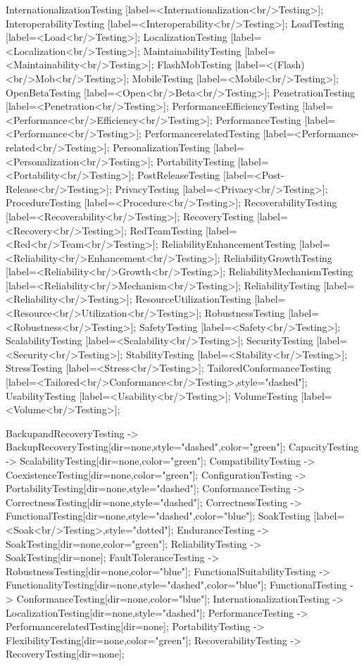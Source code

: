 \documentclass{article}
\begin{document}
{InternationalizationTesting [label=<Internationalization<br/>Testing>];
InteroperabilityTesting [label=<Interoperability<br/>Testing>];
LoadTesting [label=<Load<br/>Testing>];
LocalizationTesting [label=<Localization<br/>Testing>];
MaintainabilityTesting [label=<Maintainability<br/>Testing>];
FlashMobTesting [label=<(Flash)<br/>Mob<br/>Testing>];
MobileTesting [label=<Mobile<br/>Testing>];
OpenBetaTesting [label=<Open<br/>Beta<br/>Testing>];
PenetrationTesting [label=<Penetration<br/>Testing>];
PerformanceEfficiencyTesting [label=<Performance<br/>Efficiency<br/>Testing>];
PerformanceTesting [label=<Performance<br/>Testing>];
PerformancerelatedTesting [label=<Performance-related<br/>Testing>];
PersonalizationTesting [label=<Personalization<br/>Testing>];
PortabilityTesting [label=<Portability<br/>Testing>];
PostReleaseTesting [label=<Post-Release<br/>Testing>];
PrivacyTesting [label=<Privacy<br/>Testing>];
ProcedureTesting [label=<Procedure<br/>Testing>];
RecoverabilityTesting [label=<Recoverability<br/>Testing>];
RecoveryTesting [label=<Recovery<br/>Testing>];
RedTeamTesting [label=<Red<br/>Team<br/>Testing>];
ReliabilityEnhancementTesting [label=<Reliability<br/>Enhancement<br/>Testing>];
ReliabilityGrowthTesting [label=<Reliability<br/>Growth<br/>Testing>];
ReliabilityMechanismTesting [label=<Reliability<br/>Mechanism<br/>Testing>];
ReliabilityTesting [label=<Reliability<br/>Testing>];
ResourceUtilizationTesting [label=<Resource<br/>Utilization<br/>Testing>];
RobustnessTesting [label=<Robustness<br/>Testing>];
SafetyTesting [label=<Safety<br/>Testing>];
ScalabilityTesting [label=<Scalability<br/>Testing>];
SecurityTesting [label=<Security<br/>Testing>];
StabilityTesting [label=<Stability<br/>Testing>];
StressTesting [label=<Stress<br/>Testing>];
TailoredConformanceTesting [label=<Tailored<br/>Conformance<br/>Testing>,style="dashed"];
UsabilityTesting [label=<Usability<br/>Testing>];
VolumeTesting [label=<Volume<br/>Testing>];

BackupandRecoveryTesting -> BackupRecoveryTesting[dir=none,style="dashed",color="green"];
CapacityTesting -> ScalabilityTesting[dir=none,color="green"];
CompatibilityTesting -> CoexistenceTesting[dir=none,color="green"];
ConfigurationTesting -> PortabilityTesting[dir=none,style="dashed"];
ConformanceTesting -> CorrectnessTesting[dir=none,style="dashed"];
CorrectnessTesting -> FunctionalTesting[dir=none,style="dashed",color="blue"];
SoakTesting [label=<Soak<br/>Testing>,style="dotted"];
EnduranceTesting -> SoakTesting[dir=none,color="green"];
ReliabilityTesting -> SoakTesting[dir=none];
FaultToleranceTesting -> RobustnessTesting[dir=none,color="blue"];
FunctionalSuitabilityTesting -> FunctionalityTesting[dir=none,style="dashed",color="blue"];
FunctionalTesting -> ConformanceTesting[dir=none,color="blue"];
InternationalizationTesting -> LocalizationTesting[dir=none,style="dashed"];
PerformanceTesting -> PerformancerelatedTesting[dir=none];
PortabilityTesting -> FlexibilityTesting[dir=none,color="green"];
RecoverabilityTesting -> RecoveryTesting[dir=none];

}
\end{document}
